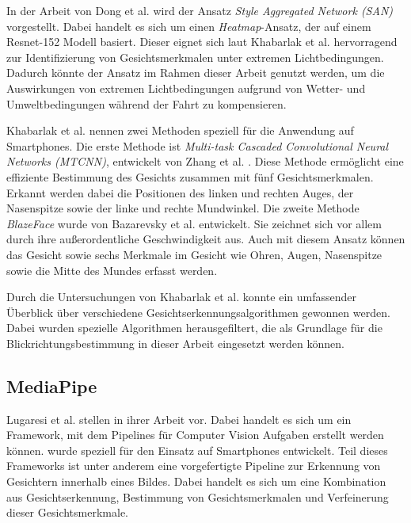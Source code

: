 In der Arbeit von Dong et al. \cite{paper:san} wird der Ansatz \textit{Style Aggregated Network (SAN)} vorgestellt. Dabei handelt es sich um einen \textit{Heatmap}-Ansatz, der auf einem Resnet-152 Modell basiert. Dieser eignet sich laut Khabarlak et al. \cite{paper:face:survey} hervorragend zur Identifizierung von Gesichtsmerkmalen unter extremen Lichtbedingungen. Dadurch könnte der Ansatz im Rahmen dieser Arbeit genutzt werden, um die Auswirkungen von extremen Lichtbedingungen aufgrund von Wetter- und Umweltbedingungen während der Fahrt zu kompensieren.

Khabarlak et al. nennen zwei Methoden speziell für die Anwendung auf Smartphones. Die erste Methode ist \textit{Multi-task Cascaded Convolutional Neural Networks (MTCNN)}, entwickelt von Zhang et al. \cite{paper:mtcnn}. Diese Methode ermöglicht eine effiziente Bestimmung des Gesichts zusammen mit fünf Gesichtsmerkmalen. Erkannt werden dabei die Positionen des linken und rechten Auges, der Nasenspitze sowie der linke und rechte Mundwinkel. Die zweite Methode \textit{BlazeFace} wurde von Bazarevsky et al. \cite{paper:mediapipe:blazeface} entwickelt. Sie zeichnet sich vor allem durch ihre außerordentliche Geschwindigkeit aus. Auch mit diesem Ansatz können das Gesicht sowie sechs Merkmale im Gesicht wie Ohren, Augen, Nasenspitze sowie die Mitte des Mundes erfasst werden.

Durch die Untersuchungen von Khabarlak et al. konnte ein umfassender Überblick über verschiedene Gesichtserkennungsalgorithmen gewonnen werden. Dabei wurden spezielle Algorithmen herausgefiltert, die als Grundlage für die Blickrichtungsbestimmung in dieser Arbeit eingesetzt werden können.


\subsection{MediaPipe}\label{sec:related:mediapipe}\label{sec:related:face:mediapipe}

Lugaresi et al. stellen in ihrer Arbeit \cite{paper:mediapipe} \mediapipe vor. Dabei handelt es sich um ein Framework, mit dem Pipelines für Computer Vision Aufgaben erstellt werden können. \mediapipe wurde speziell für den Einsatz auf Smartphones entwickelt. Teil dieses Frameworks ist unter anderem eine vorgefertigte Pipeline zur Erkennung von Gesichtern innerhalb eines Bildes. Dabei handelt es sich um eine Kombination aus Gesichtserkennung, Bestimmung von Gesichtsmerkmalen und Verfeinerung dieser Gesichtsmerkmale.

